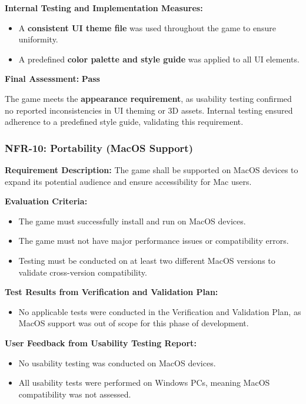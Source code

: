 \documentclass[12pt, titlepage]{article}
\begin{document}
\textbf{Internal Testing and Implementation Measures:}  
\begin{itemize}
    \item A \textbf{consistent UI theme file} was used throughout the game to ensure uniformity.
    \item A predefined \textbf{color palette and style guide} was applied to all UI elements.
\end{itemize}

\textbf{Final Assessment:} \textbf{Pass}  

The game meets the \textbf{appearance requirement}, as usability testing confirmed no reported inconsistencies in UI theming or 3D assets. Internal testing ensured adherence to a predefined style guide, validating this requirement.


\subsubsection{NFR-10: Portability (MacOS Support)}

\textbf{Requirement Description:}  
The game shall be supported on MacOS devices to expand its potential audience and ensure accessibility for Mac users.

\textbf{Evaluation Criteria:}  
\begin{itemize}
    \item The game must successfully install and run on MacOS devices.
    \item The game must not have major performance issues or compatibility errors.
    \item Testing must be conducted on at least two different MacOS versions to validate cross-version compatibility.
\end{itemize}

\textbf{Test Results from Verification and Validation Plan:}  
\begin{itemize}
    \item No applicable tests were conducted in the Verification and Validation Plan, as MacOS support was out of scope for this phase of development.
\end{itemize}

\textbf{User Feedback from Usability Testing Report:}  
\begin{itemize}
    \item No usability testing was conducted on MacOS devices.
    \item All usability tests were performed on Windows PCs, meaning MacOS compatibility was not assessed.
\end{itemize}
\end{document}
